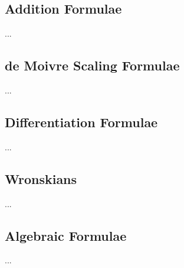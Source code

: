 \subsection{Addition Formulae}
...
\subsection{de Moivre Scaling Formulae}
...
\subsection{Differentiation Formulae}
...
\subsection{Wronskians}
...
\subsection{Algebraic Formulae}
...